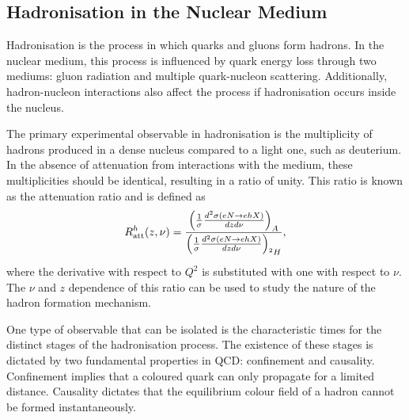 \subsection{Hadronisation in the Nuclear Medium}
\label{10.30::hadronisation_in_the_nuclear_medium}
    Hadronisation is the process in which quarks and gluons form hadrons.
    In the nuclear medium, this process is influenced by quark energy loss through two mediums: gluon radiation and multiple quark-nucleon scattering.
    Additionally, hadron-nucleon interactions also affect the process if hadronisation occurs inside the nucleus.

    The primary experimental observable in hadronisation is the multiplicity of hadrons produced in a dense nucleus compared to a light one, such as deuterium.
    In the absence of attenuation from interactions with the medium, these multiplicities should be identical, resulting in a ratio of unity.
    This ratio is known as the attenuation ratio and is defined as
    \begin{equation*}
        R^h_{\text{att}}(z,\nu) = \frac
            {\left( \frac{1}{\sigma} \frac{d^2\sigma(eN \rightarrow ehX)}{dzd\nu} \right)_A}
            {\left( \frac{1}{\sigma} \frac{d^2\sigma(eN \rightarrow ehX)}{dzd\nu} \right)_{\prescript{2}{}{H}}},
    \end{equation*}
    where the derivative with respect to $Q^2$ is substituted with one with respect to $\nu$.
    The $\nu$ and $z$ dependence of this ratio can be used to study the nature of the hadron formation mechanism.

    One type of observable that can be isolated is the characteristic times for the distinct stages of the hadronisation process.
    The existence of these stages is dictated by two fundamental properties in QCD: confinement and causality.
    Confinement implies that a coloured quark can only propagate for a limited distance.
    Causality dictates that the equilibrium colour field of a hadron cannot be formed instantaneously.

    
    
    
